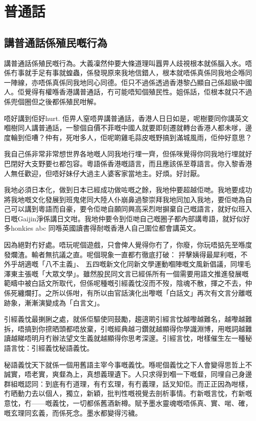 \chapter{普通話}

\section{講普通話係殖民嘅行為}
講普通話係殖民嘅行為。大義凜然仲要大條道理叫囂畀人歧視根本就係腦入水。唔係冇事就手足有事就蝗蟲，係發現原來我地信錯人，根本就唔係真係同我地企喺同一陣線，亦唔係真係同我地同心同德。佢只不過係透過香港黎凸顯自己係超級中國人。佢覺得有權喺香港講普通話，冇可能唔知個殖民性。姐係話，佢根本就只不過係兜個圈但之後都係殖民咁解。

唔好講到佢好hurt. 佢畀人窒唔畀講普通話，香港人日日如是，呢樹要同你講英文嗰樹同人講普通話，一黎個自價不菲嘅中國人就要即刻遷就轉台香港人都未嗲，邊度輪到佢嘈？仲有，死咁多人，佢呢啲雞毛蒜皮嘅野搞到滿城風雨，佢仲好意思？

我自己係非常非常想世界各地嘅人同我地行埋一齊，但係咪覺得你同我地行埋就好巴閉好大支野要乜都包容。粵語係香港嘅語言，而且應該係至尊語言。你入黎香港人無任歡迎，但唔好妹仔大過主人婆客家當地主。好煩。好討厭。


我地必須日本化，做到日本已經成功做咗嘅之餘，我地仲要超越佢哋。我地要成功將我地嘅文化發展到班鬼佬同大陸人仆崩鼻過黎崇拜我地同加入我地，要佢哋為自己可以講到粵語而自豪，要令佢哋自願同興高采烈咁摒棄自己嘅語言，就好似班入日嘅Gaijin淨係講日文咁。我地仲要令到佢哋自己嘅圈子都內部講粵語，就好似好多honkies abc 同喺英國讀書得耐嘅香港人自己圍位都會講英文。



因為絕對冇好處。唔玩呢個遊戲，只會俾人覺得你冇了，你廢，你玩唔掂先至喺度發爛渣。輸者無抗議之直。呢個現象一直都冇徹底打破： 抨擊姨得最犀利嘅，不外乎胡適嘅「八不主義」、 五四嘅新文化同新文學運動嗰陣嘅文風新倡議，同埋毛澤東主張嘅「大眾文學」。雖然股民同文言已經係所有一個需要用語文推進發展嘅範疇中被白話文所取代，但係呢種嘅引經義忱沒而不歿，陰魂不散，揮之不去，仲係死纏爛打。之所以係咁，有所以由官話演化出嚟嘅「白話文」再次有文言分離嘅跡象，漸漸演變成為「白言文」。

引經義忱最揦脷之處，就係佢驅使同鼓勵，趨逳啲引經言忱越嚟越難名，越嚟越難拆，唔搞到你𢱑晒頭都唔放棄，引嘅經典越刁鑽就越顯得你學識淵博，用嘅詞越難讀越睇唔明月冇辦法望文生義就越顯得你思考深邃。引經言忱，咁樣催生左一種秘語言忱：引經義忱秘語義忱。

秘語義忱天下就係一個用舊語主宰今事嘅義忱。喺呢個義忱之下人會變得思哲上不誠實，唔老實，爽韰為上，真想義理遺下。人只求得到嗰一下嘅韰，同埋自己身邊群組嘅認同：到底有冇道理，有冇玄理，有冇義理，話叉知佢。而正正因為咁樣，冇晒動力去以個人，獨立，新穎，批判性嘅視覺去剖析事情。冇新嘅言忱，冇新嘅意忱，冇——嘅義忱，一切都係舊酒新樽。賦予墨水靈魂嘅唔係真、實、啱、確，嘅玄理同玄義，而係死念。墨水都變得污穢。

